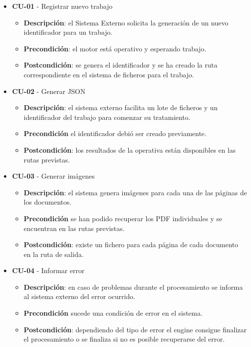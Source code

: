 \begin{itemize}
	\item \textbf{CU-01} - Registrar nuevo trabajo
	\begin{itemize}
		\item \textbf{Descripción}: el Sistema Externo solicita la generación de un nuevo identificador para un trabajo.
		\item \textbf{Precondición}: el motor está operativo y esperando trabajo.
		\item \textbf{Postcondición}: se genera el identificador y se ha creado la ruta correspondiente en el sistema de ficheros para el trabajo.
	\end{itemize}
\item \textbf{CU-02} - Generar JSON
	\begin{itemize}
		\item \textbf{Descripción}: el sistema externo facilita un lote de ficheros y un identificador del trabajo para comenzar su tratamiento.
		\item \textbf{Precondición} el identificador debió ser creado previamente.
		\item \textbf{Postcondición}: los resultados de la operativa están disponibles en las rutas previstas.
\end{itemize}
\item \textbf{CU-03} - Generar imágenes
	\begin{itemize}
		\item \textbf{Descripción}: el sistema genera imágenes para cada una de las páginas de los documentos.
		\item \textbf{Precondición} se han podido recuperar los PDF individuales y se encuentran en las rutas previstas.
		\item \textbf{Postcondición}: existe un fichero para cada página de cada documento en la ruta de salida.
\end{itemize}
\item \textbf{CU-04} - Informar error
	\begin{itemize}
		\item \textbf{Descripción}: en caso de problemas durante el procesamiento se informa al sistema externo del error ocurrido.
		\item \textbf{Precondición} sucede una condición de error en el sistema.
		\item \textbf{Postcondición}: dependiendo del tipo de error el engine consigue finalizar el procesamiento o se finaliza si no es posible recuperarse del error.
\end{itemize}

\end{itemize}
